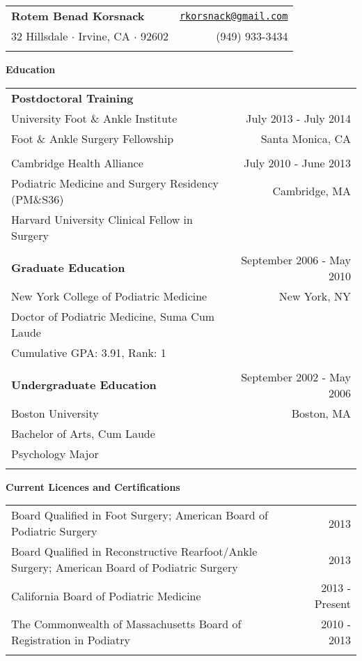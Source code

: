 \documentclass[letterpaper,10pt]{article}
\newcommand{\len}{7in}
\newcommand{\resheading}[1]{{\large \colorbox{mygrey}{
    \begin{minipage}{6.9in}{\textbf{#1}}
    \end{minipage}}}}
\begin{document}
\begin{tabular*}{\len}{@{\extracolsep{\fill}}lr}
    \textbf{\LARGE Rotem Benad Korsnack} & \href{mailto:rkorsnack@gmail.com}{\texttt{rkorsnack@gmail.com}} \\
    32 Hillsdale $\cdot$ Irvine, CA $\cdot$ 92602 & (949) 933-3434 \\ \\
\end{tabular*}
\resheading{Education}
\begin{tabular*}{\len}{@{\extracolsep{\fill}}lr}
    \\
    \textbf{Postdoctoral Training} \\
    University Foot \& Ankle Institute & July 2013 - July 2014 \\
    Foot \& Ankle Surgery Fellowship & Santa Monica, CA \\
    \\
    Cambridge Health Alliance & July 2010 - June 2013 \\
    Podiatric Medicine and Surgery Residency (PM\&S36) & Cambridge, MA \\
    Harvard University Clinical Fellow in Surgery \\
    \\
    \textbf{Graduate Education} & September 2006 - May 2010 \\
    New York College of Podiatric Medicine & New York, NY \\
    Doctor of Podiatric Medicine, Suma Cum Laude \\
	Cumulative GPA: 3.91, Rank: 1 \\
    \\
    \textbf{Undergraduate Education} & September 2002 - May 2006 \\
    Boston University & Boston, MA \\
    Bachelor of Arts, Cum Laude \\
    Psychology Major \\
    \\
\end{tabular*}
\resheading{Current Licences and Certifications}
\begin{tabular*}{\len}{@{\extracolsep{\fill}}lr}
    \\
    Board Qualified in Foot Surgery; American Board of Podiatric Surgery  & 2013 \\
    Board Qualified in Reconstructive Rearfoot/Ankle Surgery; American Board of Podiatric Surgery & 2013 \\
    California Board of Podiatric Medicine & 2013 - Present \\
    The Commonwealth of Massachusetts Board of Registration in Podiatry & 2010 - 2013 \\
    \\
\end{tabular*}
\end{document}

